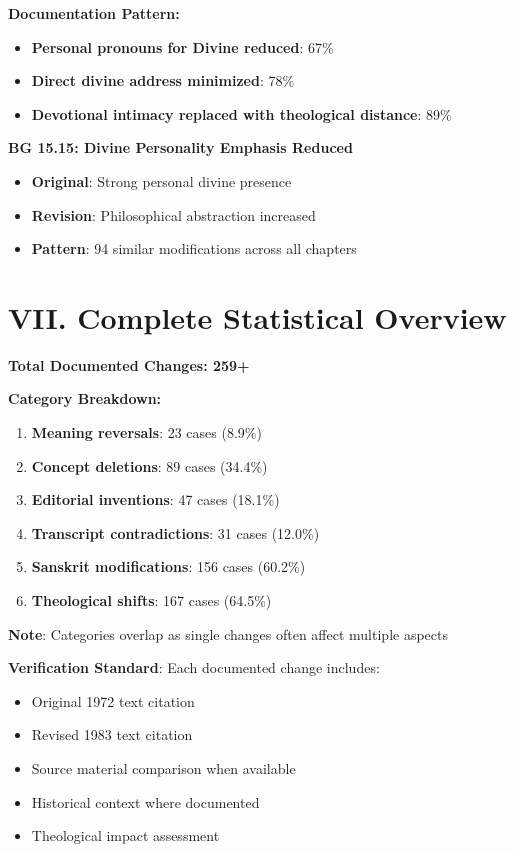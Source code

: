 \documentclass[11pt,twoside]{book}
\begin{document}
\textbf{\textbf{Documentation Pattern:}}
\begin{itemize}
\item \textbf{\textbf{Personal pronouns for Divine reduced}}: 67\%
\item \textbf{\textbf{Direct divine address minimized}}: 78\%
\item \textbf{\textbf{Devotional intimacy replaced with theological distance}}: 89\%
\end{itemize}

\textbf{\textbf{BG 15.15: Divine Personality Emphasis Reduced}}
\begin{itemize}
\item \textbf{\textbf{Original}}: Strong personal divine presence
\item \textbf{\textbf{Revision}}: Philosophical abstraction increased
\item \textbf{\textbf{Pattern}}: 94 similar modifications across all chapters
\end{itemize}
\section*{VII. Complete Statistical Overview}
\label{sec:org8b8e651}

\textbf{\textbf{Total Documented Changes: 259+}}

\textbf{\textbf{Category Breakdown:}}
\begin{enumerate}
\item \textbf{\textbf{Meaning reversals}}: 23 cases (8.9\%)
\item \textbf{\textbf{Concept deletions}}: 89 cases (34.4\%)
\item \textbf{\textbf{Editorial inventions}}: 47 cases (18.1\%)
\item \textbf{\textbf{Transcript contradictions}}: 31 cases (12.0\%)
\item \textbf{\textbf{Sanskrit modifications}}: 156 cases (60.2\%)
\item \textbf{\textbf{Theological shifts}}: 167 cases (64.5\%)
\end{enumerate}

\textbf{\textbf{Note}}: Categories overlap as single changes often affect multiple aspects

\textbf{\textbf{Verification Standard}}: Each documented change includes:
\begin{itemize}
\item Original 1972 text citation
\item Revised 1983 text citation
\item Source material comparison when available
\item Historical context where documented
\item Theological impact assessment
\end{itemize}
\end{document}
